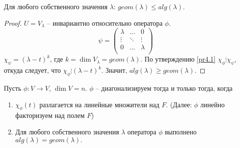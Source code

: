 \begin{corollary}
    Для любого собственного значения $\lambda$: $geom(\lambda) \leq alg(\lambda)$.
\end{corollary}

\begin{proof}
    $U = V_{\lambda}$ -- инвариантно относительно оператора $\phi$.
    \begin{equation*}
    \psi =
        \left(
            \begin{array}{ccc}
            \lambda & \dots & 0 \\
            \vdots & \ddots & \vdots \\
            0 & \dots & \lambda \\
            \end{array}
        \right)
    \end{equation*}
    $\chi_{\psi} = (\lambda - t)^k$, где $k = \dim V_{\lambda} = geom(\lambda)$. 
    По утверждению \ref{pr4.1} $\chi_{\phi} \vdots \chi_{\psi}$, откуда следует, что 
    $\chi_{\phi} \vdots (\lambda - t)^k$. Значит, $alg(\lambda) \geq geom(\lambda)$.
\end{proof}

\begin{theorem}
    Пусть $\phi: V \to V$, $\dim V = n$. $\phi$ -- диагонализируем тогда и только тогда, когда 
    \begin{enumerate}
        \item $\chi_{\phi}(t)$ разлагается на линейные множители над $F$. (Далее: $\phi$ линейно факторизуем над полем $F$)
        \item Для любого собственного значения $\lambda$ оператора $\phi$ выполнено $alg(\lambda) = geom(\lambda).$
    \end{enumerate}
\end{theorem}

